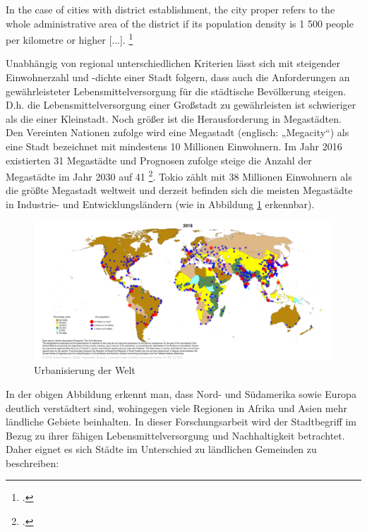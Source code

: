 \documentclass{scrartcl}
\begin{document}
\begin{displayquote}
In the case of cities with district establishment, the city proper refers to the whole administrative area of the district if its population density is 1 500 people per kilometre or higher [...]. \footcite[S.~2]{UnitedNations2005Table2005} 
\end{displayquote}

Unabhängig von regional unterschiedlichen Kriterien lässt sich mit steigender Einwohnerzahl und -dichte einer Stadt folgern, dass auch die Anforderungen an gewährleisteter Lebensmittelversorgung für die städtische Bevölkerung steigen. D.h. die Lebensmittelversorgung einer Großstadt zu gewährleisten ist schwieriger als die einer Kleinstadt. Noch größer ist die Herausforderung in Megastädten. Den Vereinten Nationen zufolge wird eine Megastadt (englisch: „Megacity“) als eine Stadt bezeichnet mit mindestens 10 Millionen Einwohnern. Im Jahr 2016 existierten 31 Megastädte und Prognosen zufolge steige die Anzahl der Megastädte im Jahr 2030 auf 41 \footcite{UnitedNations2016The2016}. Tokio zählt mit 38 Millionen Einwohnern als die größte Megastadt weltweit und derzeit befinden sich die meisten Megastädte in Industrie- und Entwicklungsländern (wie in Abbildung \ref{figUrban} erkennbar). 

\begin{figure}[h]
\centering
\hspace*{-4cm}   
\includegraphics[width=20cm]{image_folder/CityPop_Urban.png}
\caption{Urbanisierung der Welt}
\label{figUrban}
\end{figure}

In der obigen Abbildung erkennt man, dass Nord- und Südamerika sowie Europa deutlich verstädtert sind, wohingegen viele Regionen in Afrika und Asien mehr ländliche Gebiete beinhalten. In dieser Forschungsarbeit wird der Stadtbegriff im Bezug zu ihrer fähigen Lebensmittelversorgung und Nachhaltigkeit betrachtet. Daher eignet es sich Städte im Unterschied zu ländlichen Gemeinden zu beschreiben: 
\end{document}
